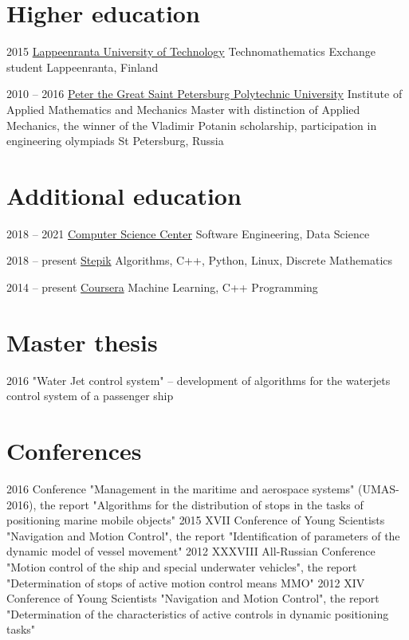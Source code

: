 \documentclass[11pt,a4paper]{moderncv}
\begin{document}
\pagebreak

\section{Higher education}
\cventry
    {2015}
    {\href{https://www.lut.fi/en}{Lappeenranta University of Technology}}
    {Technomathematics}
    {\newline Exchange student}
    {}
    {Lappeenranta, Finland}

\cventry
    {2010 -- 2016}
    {\href{https://english.spbstu.ru/}{Peter the Great Saint Petersburg Polytechnic University}}
    {\newline Institute of Applied Mathematics and Mechanics}
    {\newline Master with distinction of Applied Mechanics,
    \newline the winner of the Vladimir Potanin scholarship,
    participation in engineering olympiads}
    {}
    {St Petersburg, Russia}
    
\section{Additional education}
\cventry
    {2018 -- 2021}
    {\href{https://compscicenter.ru/students/3977/}
    {Computer Science Center}}
    {Software Engineering, Data Science}
    {}
    {}
    {}

\cventry
    {2018 -- present}
    {\href{https://stepik.org/users/57620777}{Stepik}}
    {Algorithms, C++, Python, Linux, Discrete Mathematics}
    {}
    {}
    {}

\cventry
    {2014 -- present}
    {\href{https://www.coursera.org/user/6824f02bb7dea6b34f4c85686333f84c}{Coursera}}
    {Machine Learning, C++ Programming}
    {}
    {}
    {}

\section{Master thesis}
\cvline
    {2016}
    {"Water Jet control system" -- development of algorithms for the waterjets control system of a passenger ship}

\section{Conferences}
\cvline
    {2016}
    {Conference "Management in the maritime and aerospace systems" (UMAS-2016),
    the report "Algorithms for the distribution of stops in the tasks of positioning marine mobile objects"}
\cvline
    {2015}
    {XVII Conference of Young Scientists "Navigation and Motion Control",
    the report "Identification of parameters of the dynamic model of vessel movement"}
\cvline
    {2012}
    {XXXVIII All-Russian Conference "Motion control of the ship and special underwater vehicles",
    the report "Determination of stops of active motion control means MMO"}
\cvline
    {2012}
    {XIV Conference of Young Scientists "Navigation and Motion Control",
    the report "Determination of the characteristics of active controls in dynamic positioning tasks"}
\end{document}
